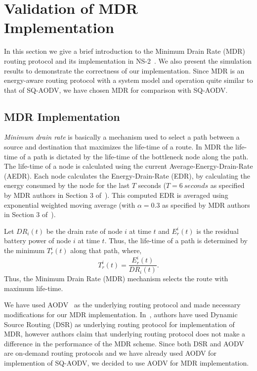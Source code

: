 \section{Validation of MDR Implementation}
\label{MDR-verification}
In this section we give a brief introduction to the Minimum Drain Rate (MDR)~\cite{mdr} routing protocol and its implementation in NS-2~\cite{NS-2}. We also present the simulation results to demonstrate the correctness of our implementation.
Since MDR is an energy-aware routing protocol with a system model and operation quite similar to that of SQ-AODV, we have chosen MDR for comparison with SQ-AODV.

\subsection{MDR Implementation}
\label{mdr-implementation}
\textit{Minimum drain rate} is basically a mechanism used to select a path between a source and destination that maximizes the life-time of a route. In MDR the life-time of a path is dictated by the life-time of the bottleneck node along the path. The life-time of a node is calculated using the current Average-Energy-Drain-Rate (AEDR). Each node calculates the Energy-Drain-Rate (EDR), by calculating the energy consumed by the node for the last $T$ seconds ($T=6 \ seconds$ as specified by MDR authors in Section 3 of~\cite{mdr}). This computed EDR is averaged using exponential weighted moving average (with $\alpha=0.3$ as specified by MDR authors in Section 3 of~\cite{mdr}).

Let $DR_{i}{(t)}$ be the drain rate of node $i$ at time $t$ and $E_{r}^{i}{(t)}$ is the residual battery power of node $i$ at time $t$. Thus, the life-time of a path is determined by the minimum $T_{r}^{i}{(t)}$ along that path, where,
\begin{equation*}
T_{r}^{i}{(t)} = \frac{E_{r}^{i}{(t)}}{DR_{i}{(t)}}. 
\end{equation*}
Thus, the Minimum Drain Rate (MDR) mechanism selects the route with maximum life-time.

We have used AODV~\cite{aodv} as the underlying routing protocol and made necessary modifications for our MDR implementation. In~\cite{mdr}, authors have used Dynamic Source Routing (DSR) as underlying routing protocol for implementation of MDR, however authors claim that underlying routing protocol does not make a difference in the performance of the MDR scheme. Since both DSR and AODV are on-demand routing protocols and we have already used AODV for implemention of SQ-AODV, we decided to use AODV for MDR implementation.

